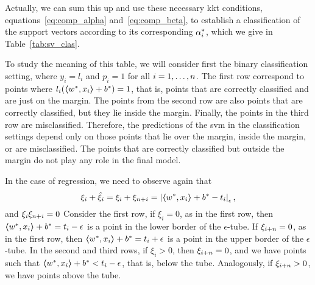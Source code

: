 %
Actually, we can sum this up and use these necessary \acrshort{kkt} conditions, equations~\eqref{eq:comp_alpha} and~\eqref{eq:comp_beta}, to establish a classification of the support vectors according to its corresponding $\opt{\alpha}_i$, which we give in Table~\ref{tab:sv_clas}.
%
\begin{table}[t!]
    \caption{Classification of the support vectors in terms of the value of $\opt{\alpha}_i$.}
    \label{tab:sv_clas}
    \centering
\end{table}
%
To study the meaning of this table, we will consider first the binary classification setting, where $y_i = l_i$ and $p_i=1$ for all $i=1, \ldots, n$. The first row correspond to points where $l_i (\bm{\left\langle} {w}^*, x_i \bm{\right\rangle} + {b}^*) = 1$, that is, points that are correctly classified and are just on the margin. The points from the second row are also points that are correctly classified, but they lie inside the margin. Finally, the points in the third row are misclassified.
Therefore, the predictions of the \acrshort{svm} in the classification settings depend only on those points that lie over the margin, inside the margin, or are misclassified. The points that are correctly classified but outside the margin do not play any role in the final model.
%

In the case of regression, we need to observe again that 
$$ \xi_i + \hat{\xi}_i = \xi_i + {\xi}_{n + i} = \left|\bm{\left\langle} {w}^*, x_i \bm{\right\rangle} + {b}^* - t_i\right|_\epsilon ,$$
and $\xi_i {\xi}_{n + i} = 0$ 
Consider the first row, if $\xi_i = 0$, as in the first row, then $\bm{\left\langle} {w}^*, x_i \bm{\right\rangle} + {b}^* = t_i - \epsilon$ is  a point in the lower border of the $\epsilon$-tube. If $\xi_{i + n} = 0$, as in the first row, then $\bm{\left\langle} {w}^*, x_i \bm{\right\rangle} + {b}^* = t_i + \epsilon$ is  a point in the upper border of the $\epsilon$-tube.
%
In the second and third rows, if $\xi_i > 0$, then ${\xi}_{i + n} = 0$, and we have points such that $\bm{\left\langle} {w}^*, x_i \bm{\right\rangle} + {b}^* < t_i - \epsilon$, that is, below the tube. 
Analogously, if ${\xi}_{i + n} > 0$, we have points above the tube.
%


